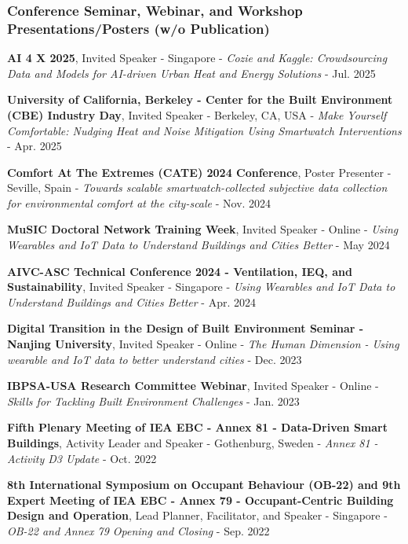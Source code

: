 \documentclass[10pt,a4paper]{article}
\begin{document}
\begin{small}
\subsubsection*{Conference Seminar, Webinar, and Workshop Presentations/Posters (w/o Publication)}
\begin{etaremune}
\item
\textbf{AI 4 X 2025}, Invited Speaker - Singapore - \emph{Cozie and Kaggle: Crowdsourcing Data and Models for AI-driven Urban Heat and Energy Solutions} - Jul. 2025
\item
\textbf{University of California, Berkeley - Center for the Built Environment (CBE) Industry Day}, Invited Speaker - Berkeley, CA, USA - \emph{Make Yourself Comfortable: Nudging Heat and Noise Mitigation Using Smartwatch Interventions} - Apr. 2025
\item
\textbf{Comfort At The Extremes (CATE) 2024 Conference}, Poster Presenter - Seville, Spain - \emph{Towards scalable smartwatch-collected subjective data collection for environmental comfort at the city-scale} - Nov. 2024
\item
\textbf{MuSIC Doctoral Network Training Week}, Invited Speaker - Online - \emph{Using Wearables and IoT Data to Understand Buildings and Cities Better} - May 2024
\item
\textbf{AIVC-ASC Technical Conference 2024 - Ventilation, IEQ, and Sustainability}, Invited Speaker - Singapore - \emph{Using Wearables and IoT Data to Understand Buildings and Cities Better} - Apr. 2024
\item
\textbf{Digital Transition in the Design of Built Environment Seminar - Nanjing University}, Invited Speaker - Online - \emph{The Human Dimension - Using wearable and IoT data to better understand cities} - Dec. 2023
\item
\textbf{IBPSA-USA Research Committee Webinar}, Invited Speaker - Online - \emph{Skills for Tackling Built Environment Challenges} - Jan. 2023%
\item
\textbf{Fifth Plenary Meeting of IEA EBC - Annex 81 - Data-Driven Smart Buildings}, Activity Leader and Speaker - Gothenburg, Sweden - \emph{Annex 81 - Activity D3 Update} - Oct. 2022
\item
\textbf{8th International Symposium on Occupant Behaviour (OB-22) and 9th Expert Meeting of IEA EBC - Annex 79 - Occupant-Centric Building Design and Operation}, Lead Planner, Facilitator, and Speaker - Singapore - \emph{OB-22 and Annex 79 Opening and Closing} - Sep. 2022

\end{etaremune}
\end{small}
\end{document}
